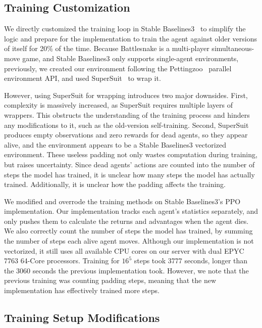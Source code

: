 \documentclass[conference]{IEEEtran}
\begin{document}
\subsection{Training Customization}

We directly customized the training loop in Stable
Baselines3~\cite{raffin2024stable}
to simplify the logic and prepare for the implementation to train the agent
against older versions of itself for 20\% of the time.
Because Battlesnake is a multi-player simultaneous-move game,
and Stable Baselines3 only supports single-agent environments,
previously, we created our environment
following the Pettingzoo~\cite{terry2021pettingzoo} parallel environment API,
and used SuperSuit~\cite{SuperSuit} to wrap it.

However, using SuperSuit for wrapping introduces two major downsides. First,
complexity is massively increased,
as SuperSuit requires multiple layers of wrappers.
This obstructs the understanding of the training process and hinders any
modifications to it, such as the old-version self-training. Second,
SuperSuit produces empty observations and zero rewards for dead agents,
so they appear alive,
and the environment appears to be a Stable Baselines3 vectorized environment.
These useless padding not only wastes computation during training,
but raises uncertainty.
Since dead agents' actions are counted into the number of steps the model has
trained, it is unclear how many steps the model has actually trained.
Additionally, it is unclear how the padding affects the training.

We modified and overrode the training methods on Stable Baselines3's PPO
implementation. Our implementation tracks each agent's statistics separately,
and only pushes them to calculate the returns and advantages when the agent
dies. We also correctly count the number of steps the model has trained,
by summing the number of steps each alive agent moves.
Although our implementation is not vectorized,
it still uses all available CPU cores on our server with dual EPYC 7763 64-Core
processors. Training for $16^5$ steps took 3777 seconds,
longer than the 3060 seconds the previous implementation took. However,
we note that the previous training was counting padding steps,
meaning that the new implementation has effectively trained more steps.

\subsection{Training Setup Modifications}
\end{document}
